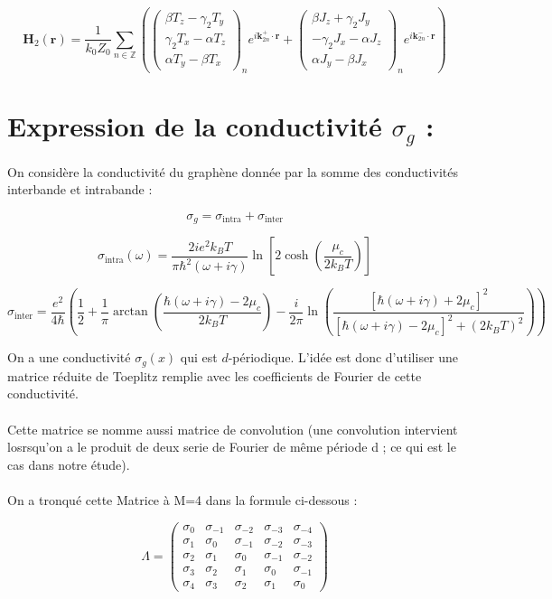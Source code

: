\documentclass{article}
\begin{document}
\[
\mathbf{H}_2(\mathbf{r}) = \frac{1}{k_0 Z_0} \sum_{n \in \mathbb{Z}} 
\left(
\begin{pmatrix}
\beta T_{z} - \gamma_2 T_{y} \\
\gamma_2 T_{x} - \alpha T_{z} \\
\alpha T_{y} - \beta T_{x}
\end{pmatrix}_n
e^{i \mathbf{k}_{2n}^{+} \cdot \mathbf{r}} +
\begin{pmatrix}
\beta J_{z} + \gamma_2 J_{y} \\
- \gamma_2 J_{x} - \alpha J_{z} \\
\alpha J_{y} - \beta J_{x}
\end{pmatrix}_n
e^{i \mathbf{k}_{2n}^{-} \cdot \mathbf{r}}
\right)
\]



\section*{Expression de la conductivité \( \sigma_g \) :}

On considère la conductivité du graphène donnée par la somme des conductivités interbande et intrabande :

\[
\sigma_g = \sigma_{\text{intra}} + \sigma_{\text{inter}}
\]

\[
\sigma_{\text{intra}}(\omega) = \frac{2i e^2 k_B T}{\pi \hbar^2 (\omega + i \gamma)} \ln \left[ 2 \cosh\left(\frac{\mu_c}{2k_B T}\right) \right]
\]

\[
\sigma_{\text{inter}} = \frac{e^2}{4\hbar} \left( \frac{1}{2} + \frac{1}{\pi} \arctan \left( \frac{\hbar(\omega + i\gamma) - 2\mu_c}{2k_B T} \right)
- \frac{i}{2\pi} \ln \left( \frac{[\hbar(\omega + i\gamma) + 2\mu_c]^2}{[\hbar(\omega + i\gamma) - 2\mu_c]^2 + (2k_B T)^2} \right) \right)
\]

\bigskip

On a une conductivité \( \sigma_g(x) \) qui est \( d \)-périodique.  
L'idée est donc d'utiliser une matrice réduite de Toeplitz remplie avec les coefficients de Fourier de cette conductivité. 
\\ \\
Cette matrice se nomme aussi matrice de convolution (une convolution intervient losrsqu'on a le produit de deux serie de Fourier de même période d ; ce qui est le cas dans notre étude).
\\ \\
On a tronqué cette Matrice à M=4 dans la formule ci-dessous :

\[
\Lambda = 
\begin{pmatrix}
\sigma_0 & \sigma_{-1} & \sigma_{-2} & \sigma_{-3} & \sigma_{-4} \\
\sigma_1 & \sigma_0     & \sigma_{-1} & \sigma_{-2} & \sigma_{-3} \\
\sigma_2 & \sigma_1     & \sigma_0     & \sigma_{-1} & \sigma_{-2} \\
\sigma_3 & \sigma_2     & \sigma_1     & \sigma_0     & \sigma_{-1} \\
\sigma_4 & \sigma_3     & \sigma_2     & \sigma_1     & \sigma_0
\end{pmatrix}
\]
\end{document}
